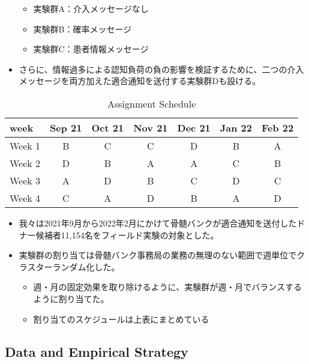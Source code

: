\documentclass[
  a4paperpaper,
]{article}
\providecommand{\tightlist}{%
  \setlength{\itemsep}{0pt}\setlength{\parskip}{0pt}}\usepackage{longtable,booktabs,array}
\begin{document}
\begin{itemize}
  \begin{itemize}
  \tightlist
  \item
    実験群A：介入メッセージなし
  \item
    実験群B：確率メッセージ
  \item
    実験群C：患者情報メッセージ
  \end{itemize}
\item
  さらに、情報過多による認知負荷の負の影響を検証するために、二つの介入メッセージを両方加えた適合通知を送付する実験群Dも設ける。
\end{itemize}

\begin{table}

\caption{Assignment Schedule}
\centering
\begin{tabular}[t]{lcccccc}
\toprule
week & Sep 21 & Oct 21 & Nov 21 & Dec 21 & Jan 22 & Feb 22\\
\midrule
Week 1 & B & C & C & D & B & A\\
Week 2 & D & B & A & A & C & B\\
Week 3 & A & D & B & C & D & C\\
Week 4 & C & A & D & B & A & D\\
\bottomrule
\end{tabular}
\end{table}

\begin{itemize}
\tightlist
\item
  我々は2021年9月から2022年2月にかけて骨髄バンクが適合通知を送付したドナー候補者11,154名をフィールド実験の対象とした。
\item
  実験群の割り当ては骨髄バンク事務局の業務の無理のない範囲で週単位でクラスターランダム化した。

  \begin{itemize}
  \tightlist
  \item
    週・月の固定効果を取り除けるように、実験群が週・月でバランスするように割り当てた。
  \item
    割り当てのスケジュールは上表にまとめている
  \end{itemize}
\end{itemize}

\hypertarget{data-and-empirical-strategy}{%
\subsection{Data and Empirical
Strategy}\label{data-and-empirical-strategy}}
\end{document}
